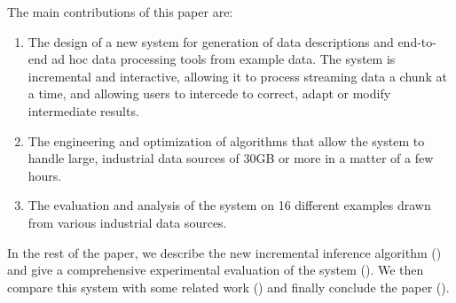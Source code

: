 The main contributions of this paper are:
\begin{enumerate}
\item The design of a new system for generation of data descriptions
and end-to-end ad hoc data processing tools from example data.  
The system is incremental and interactive, allowing it to process
streaming data a chunk at a time, and allowing users to intercede
to correct, adapt or modify intermediate results. 
\item The engineering and optimization of algorithms that allow
the system to handle large, industrial data sources of 30GB or
more in a matter of a few hours.
\item The evaluation and analysis of the system
on 16 different examples drawn from
various industrial data sources.
\end{enumerate}


In the rest of the paper, 
we describe the new incremental inference algorithm ()
and give a comprehensive experimental evaluation of the system 
(). We then compare this
system with some related work () and finally conclude
the paper ().
